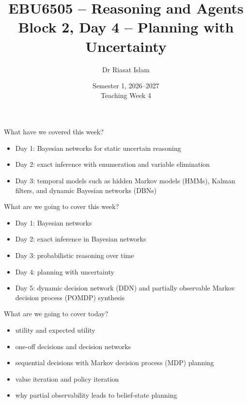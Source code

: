 \documentclass[aspectratio=169]{beamer}
\title[EBU6505 B2 D4]{EBU6505 -- Reasoning and Agents\\Block 2, Day 4 -- Planning with Uncertainty}
\author{Dr Riasat Islam}
\institute{Queen Mary University of London}
\date[Teaching Week 4]{Semester 1, 2026--2027 \\ Teaching Week 4}
\newcommand{\defaultdeckrefs}{AIMA4e Ch.16--17; Poole3e Ch.12}
\newcommand{\currentsliderefs}{\defaultdeckrefs}
\newcommand{\setslideref}[1]{\gdef\currentsliderefs{#1}}
\begin{document}
\setslideref{AIMA4e Ch.16--17; Poole3e Ch.12}
\begin{frame}
  \titlepage
\end{frame}

\begin{frame}{What have we covered this week?}
\begin{itemize}
  \item Day 1: Bayesian networks for static uncertain reasoning
  \item Day 2: exact inference with enumeration and variable elimination
  \item Day 3: temporal models such as hidden Markov models (HMMs), Kalman filters, and dynamic Bayesian networks (DBNs)
\end{itemize}
\end{frame}

\begin{frame}{What are we going to cover this week?}
\begin{itemize}
  \item Day 1: Bayesian networks
  \item Day 2: exact inference in Bayesian networks
  \item Day 3: probabilistic reasoning over time
  \item Day 4: planning with uncertainty
  \item Day 5: dynamic decision network (DDN) and partially observable Markov decision process (POMDP) synthesis
\end{itemize}
\end{frame}

\begin{frame}{What are we going to cover today?}
\begin{itemize}
  \item utility and expected utility
  \item one-off decisions and decision networks
  \item sequential decisions with Markov decision process (MDP) planning
  \item value iteration and policy iteration
  \item why partial observability leads to belief-state planning
\end{itemize}
\end{frame}
\end{document}
